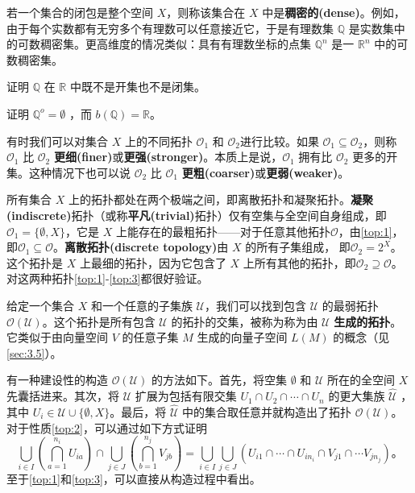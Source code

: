 \begin{theorem}
\begin{theorem}
\begin{eg}\label{eg:10.6}
	若一个集合的闭包是整个空间 $X$，则称该集合在 $X$ 中是\textbf{稠密的(dense)}。例如，由于每个实数都有无穷多个有理数可以任意接近它，于是有理数集 $\mathbb{Q}$ 是实数集中的可数稠密集。更高维度的情况类似：具有有理数坐标的点集 $\mathbb{Q}^{n}$ 是一 $\mathbb{R}^{n}$ 中的可数稠密集。
\end{eg}

\begin{exercise}
	证明 $\mathbb{Q}$ 在 $\mathbb{R}$ 中既不是开集也不是闭集。
\end{exercise}

\begin{exercise}
	证明 $\mathbb{Q}^{o} =\emptyset $ ，而 $b(\mathbb{Q}) =\mathbb{R}$。
\end{exercise}

	有时我们可以对集合 $X$ 上的不同拓扑 $\mathcal{O}_{1}$ 和 $\mathcal{O}_{2}$进行比较。如果 $\mathcal{O}_{1} \subseteq \mathcal{O}_{2}$，则称 $\mathcal{O}_{1}$ 比 $\mathcal{O}_{2}$ \textbf{更细(finer)}或\textbf{更强(stronger)}。本质上是说，$\mathcal{O}_{1}$ 拥有比 $\mathcal{O}_{2}$ 更多的开集。这种情况下也可以说 $\mathcal{O}_{2}$ 比 $\mathcal{O}_{1}$ \textbf{更粗(coarser)}或\textbf{更弱(weaker)}。

\begin{eg}\label{eg:10.7}
	所有集合 $X$ 上的拓扑都处在两个极端之间，即离散拓扑和凝聚拓扑。\textbf{凝聚(indiscrete)}拓扑（或称\textbf{平凡(trivial)}拓扑）仅有空集与全空间自身组成，即$\mathcal{O}_{1} =\{\emptyset ,X\}$，它是 $X$ 上能存在的最粗拓扑——对于任意其他拓扑$\mathcal{O}$，由\ref{top:1}，即$\mathcal{O}_{1} \subseteq \mathcal{O}$。\textbf{离散拓扑(discrete topology)}由 $X$ 的所有子集组成， 即$\mathcal{O}_{2} =2^{X}$。这个拓扑是 $X$ 上最细的拓扑，因为它包含了 $X$ 上所有其他的拓扑，即$\mathcal{O}_{2} \supseteq \mathcal{O}$。对这两种拓扑\ref{top:1}-\ref{top:3}都很好验证。
\end{eg}

	给定一个集合 $X$ 和一个任意的子集族 $\mathcal{U}$，我们可以找到包含 $\mathcal{U}$ 的最弱拓扑 $\mathcal{O} (\mathcal{U} )$。这个拓扑是所有包含 $\mathcal{U}$ 的拓扑的交集，被称为称为由 $\mathcal{U}$ \textbf{生成的拓扑}。它类似于由向量空间 $V$ 的任意子集 $M$ 生成的向量子空间 $L(M)$ 的概念（见\ref{sec:3.5}）。

	有一种建设性的构造 $\mathcal{O} (\mathcal{U} )$ 的方法如下。首先，将空集 $\emptyset $ 和 $\mathcal{U}$ 所在的全空间 $X$ 先囊括进来。其次，将 $\mathcal{U}$ 扩展为包括有限交集 $U_{1} \cap U_{2} \cap \cdots \cap U_{n}$ 的更大集族 $\hat{\mathcal{U}}$ ，其中 $U_{i} \in \mathcal{U} \cup \{\emptyset ,X\}$。最后，将 $\hat{\mathcal{U}}$ 中的集合取任意并就构造出了拓扑 $\mathcal{O} (\mathcal{U} )$。对于性质\ref{top:2}，可以通过如下方式证明
\begin{equation*}
\bigcup _{i\in I}\left(\bigcap _{a=1}^{n_{i}} U_{ia}\right) \cap \bigcup _{j\in J}\left(\bigcap _{b=1}^{n_{j}} V_{jb}\right) =\bigcup _{i\in I}\bigcup _{j\in J}( U_{i1} \cap \cdots \cap U_{in_{i}} \cap V_{j1} \cap \cdots V_{jn_{j}}) 。
\end{equation*}
至于\ref{top:1}和\ref{top:3}，可以直接从构造过程中看出。


\end{theorem}
\end{theorem}
